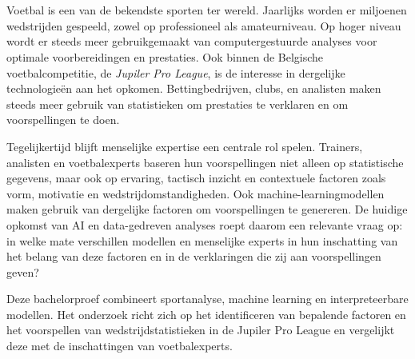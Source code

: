 
\chapter{}%
\label{ch:inleiding}

Voetbal is een van de bekendste sporten ter wereld. Jaarlijks worden er miljoenen wedstrijden gespeeld, zowel op professioneel als amateurniveau.
Op hoger niveau wordt er steeds meer gebruikgemaakt van computergestuurde analyses voor optimale voorbereidingen en prestaties.
Ook binnen de Belgische voetbalcompetitie, de \textit{Jupiler Pro League}, is de interesse in dergelijke technologieën aan het opkomen.
Bettingbedrijven, clubs, en analisten maken steeds meer gebruik van statistieken om prestaties te verklaren en om voorspellingen te doen.

\vspace{5pt}

Tegelijkertijd blijft menselijke expertise een centrale rol spelen. 
Trainers, analisten en voetbalexperts baseren hun voorspellingen niet alleen op statistische gegevens, maar ook op ervaring, tactisch inzicht en contextuele factoren 
zoals vorm, motivatie en wedstrijdomstandigheden. Ook machine-learningmodellen maken gebruik van dergelijke factoren om voorspellingen te genereren. 
De huidige opkomst van AI en data-gedreven analyses roept daarom een relevante vraag op: 
in welke mate verschillen modellen en menselijke experts in hun inschatting van het belang van deze factoren en in de verklaringen die zij aan voorspellingen geven?

\vspace{5pt}

Deze bachelorproef combineert sportanalyse, machine learning en interpreteerbare modellen. 
Het onderzoek richt zich op het identificeren van bepalende factoren en het voorspellen van wedstrijdstatistieken in de Jupiler Pro League 
en vergelijkt deze met de inschattingen van voetbalexperts.

\section{}%
\label{sec:probleemstelling}

